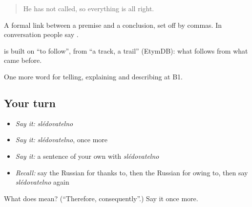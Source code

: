 \begin{quote}
He has not called, so everything is all right.
\end{quote}

A formal link between a premise and a conclusion, set off by commas. In conversation people say \emph{}.

\begin{cousinweb}
\textbf{} is built on \emph{} \textquotedblleft{}to follow\textquotedblright{}, from \emph{} \textquotedblleft{}a track, a trail\textquotedblright{} (EtymDB): what follows from what came before.
\end{cousinweb}

\begin{grammarlens}[title={What you've built}]
One more word for telling, explaining and describing at B1.
\end{grammarlens}

\subsection*{Your turn}
\begin{itemize}
\raggedright
  \item \emph{Say it:} \emph{slédovatelno}
  \item \emph{Say it:} \emph{slédovatelno}, once more
  \item \emph{Say it:} a sentence of your own with \emph{slédovatelno}
  \item \emph{Recall:} say the Russian for thanks to, then the Russian for owing to, then say \emph{slédovatelno} again
\end{itemize}

\begin{tcolorbox}[breakable,colback=teal!4,colframe=teal!35!black,title={Before you move on}]
What does  mean? (\textquotedblleft{}Therefore, consequently\textquotedblright{}.) Say it once more.
\end{tcolorbox}
